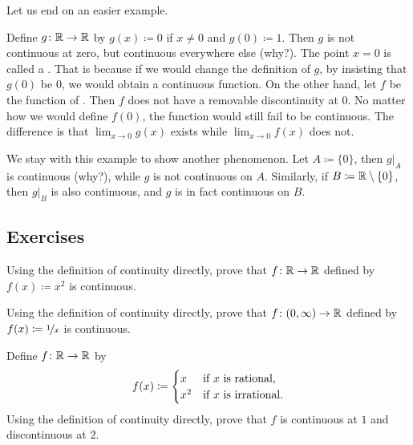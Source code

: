 Let us end on an easier example.

\begin{example} \label{example:removablediscont}
Define
$g \colon {\mathbb{R}} \to {\mathbb{R}}$ by $g(x) \coloneqq 0$ if $x \neq 0$ and
$g(0) \coloneqq 1$.  Then $g$ is not continuous at zero, but continuous everywhere else (why?).
The point $x=0$ is called a \emph{}.  That
is because if we would change the definition of $g$, by insisting that
$g(0)$ be $0$, we would obtain a continuous function.  On the other hand,
let $f$ be the function of .
Then $f$ does not have a
removable discontinuity at $0$.  No matter how we would define $f(0)$, the function
would still fail to be continuous.  The difference is that 
$\lim_{x\to 0} g(x)$ exists while
$\lim_{x\to 0} f(x)$ does not.

We stay with this example to show another phenomenon.
Let $A \coloneqq \{ 0 \}$, then $g|_A$ is continuous (why?), while $g$ is not continuous on $A$.
Similarly, if $B \coloneqq {\mathbb{R}} \setminus \{0 \}$, then $g|_B$ is also continuous,
and $g$ is in fact continuous on $B$.
\end{example}

\subsection{Exercises}

\begin{exercise}
Using the definition of continuity directly, prove that
$f \colon {\mathbb{R}} \to {\mathbb{R}}$ defined by
$f(x) \coloneqq x^2$ is continuous.
\end{exercise}

\begin{exercise}
Using the definition of continuity directly, prove that
$f \colon (0,\infty) \to {\mathbb{R}}$ defined by
$f(x) \coloneqq \nicefrac{1}{x}$ is continuous.
\end{exercise}

\begin{exercise}
Define $f \colon {\mathbb{R}} \to {\mathbb{R}}$ by
\begin{equation*}
f(x) \coloneqq
\begin{cases}
x & \text{if } x \text{ is rational,} \\
x^2 & \text{if } x \text{ is irrational.}
\end{cases}
\avoidbreak
\end{equation*}
Using the definition of continuity directly, prove that
$f$ is continuous at $1$ and discontinuous at $2$.
\end{exercise}

